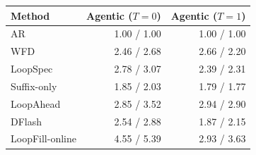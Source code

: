 \begin{tabular}{lrr}
\hline
Method & Agentic ($T=0$) & Agentic ($T=1$) \\
\hline
AR & 1.00 / 1.00 & 1.00 / 1.00 \\
WFD & 2.46 / 2.68 & 2.66 / 2.20 \\
LoopSpec & 2.78 / 3.07 & 2.39 / 2.31 \\
Suffix-only & 1.85 / 2.03 & 1.79 / 1.77 \\
LoopAhead & 2.85 / 3.52 & 2.94 / 2.90 \\
DFlash & 2.54 / 2.88 & 1.87 / 2.15 \\
LoopFill-online & 4.55 / 5.39 & 2.93 / 3.63 \\
\hline
\end{tabular}

